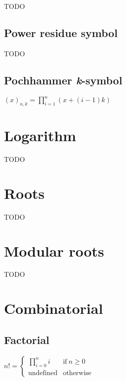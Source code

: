 TODO


\subsection{Power residue symbol}
\label{sec:Power residue symbol}

TODO


\subsection{Pochhammer \emph{k}-symbol}
\label{sec:Pochhammer k-symbol}

\( \displaystyle{
    (x)_{n,k} = \prod_{i = 1}^n (x + (i - 1)k)
}\)


\newpage
\section{Logarithm}
\label{sec:Logarithm}

TODO


\newpage
\section{Roots}
\label{sec:Roots}

TODO


\newpage
\section{Modular roots}
\label{sec:Modular roots}

TODO %


\newpage
\section{Combinatorial}
\label{sec:Combinatorial}

\subsection{Factorial}
\label{sec:Factorial}

\( \displaystyle{
    n! = \left \lbrace \begin{array}{ll}
        \displaystyle{\prod_{i = 0}^n i} & \textrm{if}~ n \ge 0 \\
        \textrm{undefined} & \textrm{otherwise}
    \end{array} \right .
}\)
\vspace{1em}

